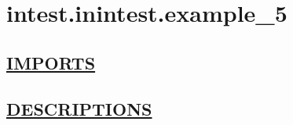 \chapter*{intest.inintest.example\_5}

\section*{\underline{IMPORTS}}

\section*{\underline{DESCRIPTIONS}}
